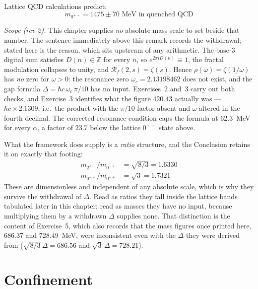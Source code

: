 \begin{remark}
Lattice QCD calculations predict\cite{morningstar1999glueball,chen2006glueball}:
\begin{equation}
m_{0^{++}} = 1475 \pm 70 \text{ MeV in quenched QCD}
\end{equation}

\emph{Scope (rev 2).} This chapter supplies \emph{no} absolute mass scale to set
beside that number. The sentence immediately above this remark records the
withdrawal; stated here is the reason, which sits upstream of any arithmetic.
The base-3 digital sum satisfies $D(n)\in\mathbb{Z}$ for every $n$, so
$e^{2\pi i D(n)}\equiv 1$, the fractal modulation collapses to unity, and
$\mathcal{R}_f(2,s)=\zeta(s)$. Hence $\rho(\omega)=\zeta(1/\omega)$ has
\emph{no} zero for $\omega>0$: the resonance zero $\omega_c = 2.13198462$ does
not exist, and the gap formula $\Delta = \hbar c\,\omega_c\,\pi/10$ has no
input. Exercises~2 and~3 carry out both checks, and Exercise~3 identifies what
the figure $420.43$ actually was --- $\hbar c\times 2.1309$, i.e.\ the product
with the $\pi/10$ factor absent and $\omega$ altered in the fourth decimal.
The corrected resonance condition caps the formula at $62.3$~MeV for every
$\alpha$, a factor of $23.7$ below the lattice $0^{++}$ state above.

What the framework does supply is a \emph{ratio} structure, and the Conclusion
retains it on exactly that footing:
\begin{align}
m_{2^{++}}/m_{0^{++}} &= \sqrt{8/3} = 1.6330 \\
m_{0^{-+}}/m_{0^{++}} &= \sqrt{3} = 1.7321
\end{align}
These are dimensionless and independent of any absolute scale, which is why
they survive the withdrawal of $\Delta$. Read as ratios they fall inside the
lattice bands tabulated later in this chapter; read as masses they have no
input, because multiplying them by a withdrawn $\Delta$ supplies none. That
distinction is the content of Exercise~5, which also records that the mass
figures once printed here, $686.37$ and $728.49$~MeV, were inconsistent even
with the $\Delta$ they were derived from ($\sqrt{8/3}\,\Delta = 686.56$ and
$\sqrt{3}\,\Delta = 728.21$).
\end{remark}

\section{Confinement}

